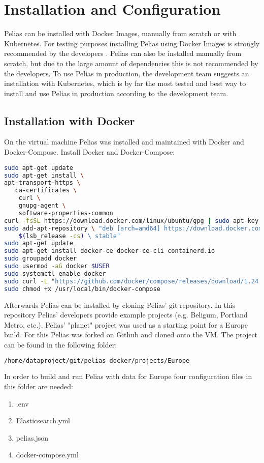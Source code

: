 \section{Installation and Configuration}
Pelias can be installed with Docker Images, manually from scratch or with Kubernetes. For testing purposes installing Pelias using Docker Images is strongly recommended by the developers \cite{Simioni2018b}. Pelias can also be installed manually from scratch, but due to the large amount of dependencies this is not recommended by the developers. To use Pelias in production, the development team suggests an installation with Kubernetes, which is by far the most tested and best way to install and use Pelias in production according to the development team.

\subsection{Installation with Docker}
On the virtual machine Pelias was installed and maintained with Docker and Docker-Compose. Install Docker and Docker-Compose:
\begin{lstlisting}[language=bash,breaklines=true]
sudo apt-get update
sudo apt-get install \
apt-transport-https \
   ca-certificates \
	curl \
	gnupg-agent \
	software-properties-common
curl -fsSL https://download.docker.com/linux/ubuntu/gpg | sudo apt-key add -
sudo add-apt-repository \ "deb [arch=amd64] https://download.docker.com/linux/ubuntu \
	$(lsb_release -cs) \ stable"
sudo apt-get update
sudo apt-get install docker-ce docker-ce-cli containerd.io
sudo groupadd docker
sudo usermod -aG docker $USER
sudo systemctl enable docker
sudo curl -L "https://github.com/docker/compose/releases/download/1.24.0/docker-compose-$(uname -s)-$(uname -m)" -o /usr/local/bin/docker-compose
sudo chmod +x /usr/local/bin/docker-compose
\end{lstlisting}
Afterwards Pelias can be installed by cloning Pelias' git repository. In this repository Pelias' developers provide example projects (e.g. Beligum, Portland Metro, etc.). Pelias' "planet" project was used as a starting point for a Europe build. For this Pelias was forked on Github and cloned onto the VM. The project can be found in the following folder:
\begin{lstlisting}[language=bash,breaklines=true]
/home/dataproject/git/pelias-docker/projects/Europe
\end{lstlisting}
In order to build and run Pelias with data for Europe four configuration files in this folder are needed:
\begin{enumerate}
\item .env
\item Elasticsearch.yml
\item pelias.json
\item docker-compose.yml
\end{enumerate}

